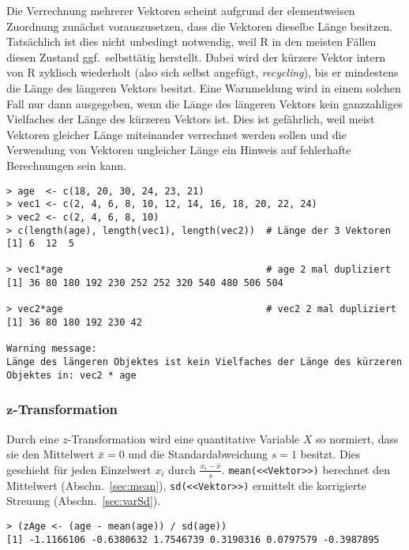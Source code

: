 Die Verrechnung mehrerer Vektoren scheint aufgrund der elementweisen Zuordnung zunächst vorauszusetzen, dass die Vektoren dieselbe Länge besitzen. Tatsächlich ist dies nicht unbedingt notwendig, weil R in den meisten Fällen diesen Zustand ggf.\ selbsttätig herstellt. Dabei wird der kürzere Vektor intern von R zyklisch wiederholt (also sich selbst angefügt, \emph{recycling}), bis er mindestens die Länge des längeren Vektors besitzt. Eine Warnmeldung wird in einem solchen Fall nur dann ausgegeben, wenn die Länge des längeren Vektors kein ganzzahliges Vielfaches der Länge des kürzeren Vektors ist. Dies ist gefährlich, weil meist Vektoren gleicher Länge miteinander verrechnet werden sollen und die Verwendung von Vektoren ungleicher Länge ein Hinweis auf fehlerhafte Berechnungen sein kann.
\begin{lstlisting}
> age  <- c(18, 20, 30, 24, 23, 21)
> vec1 <- c(2, 4, 6, 8, 10, 12, 14, 16, 18, 20, 22, 24)
> vec2 <- c(2, 4, 6, 8, 10)
> c(length(age), length(vec1), length(vec2))  # Länge der 3 Vektoren
[1] 6  12  5

> vec1*age                                    # age 2 mal dupliziert
[1] 36 80 180 192 230 252 252 320 540 480 506 504

> vec2*age                                    # vec2 2 mal dupliziert
[1] 36 80 180 192 230 42

Warning message:
Länge des längeren Objektes ist kein Vielfaches der Länge des kürzeren
Objektes in: vec2 * age
\end{lstlisting}

\subsubsection[\texorpdfstring{$z$}{z}-Transformation]{$\bm{z}$-Transformation}

Durch eine $z$-Transformation wird eine quantitative Variable $X$ so normiert, dass sie den Mittelwert $\bar{x}=0$ und die Standardabweichung $s=1$ besitzt. Dies geschieht für jeden Einzelwert $x_{i}$ durch $\frac{x_{i}-\bar{x}}{s}$. \lstinline!mean(<<Vektor>>)! berechnet den Mittelwert (Abschn.\ \ref{sec:mean}), \lstinline!sd(<<Vektor>>)! ermittelt die korrigierte Streuung (Abschn.\ \ref{sec:varSd}).
\begin{lstlisting}
> (zAge <- (age - mean(age)) / sd(age))
[1] -1.1166106 -0.6380632 1.7546739 0.3190316 0.0797579 -0.3987895
\end{lstlisting}

